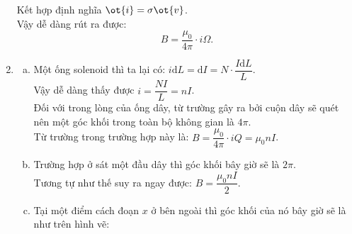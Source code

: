 \begin{loigiai}
\begin{enumerate}[1)]
Kết hợp định nghĩa $\ot{i}=\sigma\ot{v}$.\\
Vậy dễ dàng rút ra được:
\[{B} = \dfrac{{{\mu_0}}}{{4\pi }} \cdot i\Omega. \]
    \item 
    \begin{enumerate}[a)]
        \item Một ống solenoid thì ta lại có: $i\mathrm{d}L=\mathrm{d}I=N\cdot\dfrac{I \mathrm{d} L}{L}$.\\
        Vậy dễ dàng thấy được $i=\dfrac{NI}{L}=nI$.\\
        Đối với trong lòng của ống dây, từ trường gây ra bởi cuộn dây sẽ quét nên một góc khối trong toàn bộ không gian là $4\pi$.\\
        Từ trường trong trường hợp này là: $B=\dfrac{\mu_0}{4\pi}\cdot iQ=\mu_0nI$.
        \item Trường hợp ở sát một đầu dây thì góc khối bây giờ sẽ là $2\pi$.\\
        Tương tự như thế suy ra ngay được: $B=\dfrac{\mu_0nI}{2}$.
        \item Tại một điểm cách đoạn $x$ ở bên ngoài thì góc khối của nó bây giờ sẽ là như trên hình vẽ:
        \begin{center}
            


\end{center}
\end{enumerate}
\end{enumerate}
\end{loigiai}
